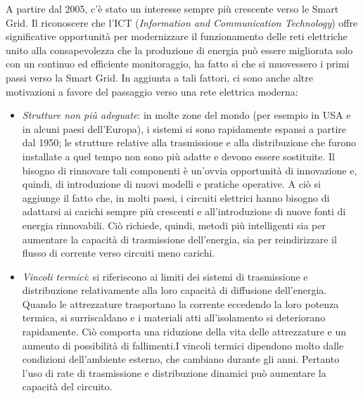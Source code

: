 A partire dal 2005, c'è stato un interesse sempre più crescente verso le Smart Grid. Il riconoscere che l'ICT (\textit{Information and Communication Technology}) offre significative opportunità per modernizzare il funzionamento delle reti elettriche unito alla consapevolezza che la produzione di energia può essere migliorata solo con un continuo ed efficiente monitoraggio, ha fatto sì che si muovessero i primi passi verso la Smart Grid. In aggiunta a tali fattori, ci sono anche altre motivazioni a favore del passaggio verso una rete elettrica moderna:
\begin{itemize}
\item \textit{Strutture non più adeguate}: in molte zone del mondo (per esempio in USA e in alcuni paesi dell'Europa), i sistemi si sono rapidamente espansi a partire dal 1950; le strutture relative alla trasmissione e alla distribuzione che furono installate a quel tempo non sono più adatte e devono essere sostituite. \newline Il bisogno di rinnovare tali componenti è un'ovvia opportunità di innovazione e, quindi, di introduzione di nuovi modelli e pratiche operative. \newline A ciò si aggiunge il fatto che, in molti paesi, i circuiti elettrici hanno bisogno di adattarsi ai carichi sempre più crescenti e all'introduzione di nuove fonti di energia rinnovabili. Ciò richiede, quindi, metodi più intelligenti sia per aumentare la capacità di trasmissione dell'energia, sia per reindirizzare il flusso di corrente verso circuiti meno carichi.

\item \textit{Vincoli termici}: si riferiscono ai limiti dei sistemi di trasmissione e distribuzione relativamente alla loro capacità di diffusione dell'energia. Quando le attrezzature trasportano la corrente eccedendo la loro potenza termica, si surriscaldano e i materiali atti all'isolamento si deteriorano rapidamente. Ciò comporta una riduzione della vita delle attrezzature e un aumento di possibilità di fallimenti.\newline I vincoli termici dipendono molto dalle condizioni dell'ambiente esterno, che cambiano durante gli anni. Pertanto l'uso di rate di trasmissione e distribuzione dinamici può aumentare la capacità del circuito.




\end{itemize}

